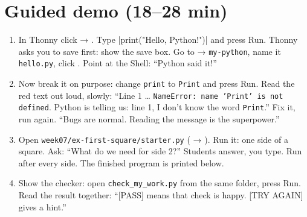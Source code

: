 \section{Guided demo (18--28 min)}
\begin{workedexample}
\begin{enumerate}[leftmargin=1.4em,itemsep=1pt]
  \item In Thonny click  → . Type \py|print("Hello, Python!")| and press Run. Thonny asks you to save first: show the save box. Go to  → \texttt{my-python}, name it \texttt{hello.py}, click . Point at the Shell: \enquote{Python said it!}
  \item Now break it on purpose: change \texttt{print} to \texttt{Print} and press Run. Read the red text out loud, slowly: \enquote{Line 1 \ldots{} \texttt{NameError: name 'Print' is not defined}. Python is telling us: line 1, I don't know the word \texttt{Print}.} Fix it, run again. \enquote{Bugs are normal. Reading the message is the superpower.}
  \item Open \texttt{week07/ex-first-square/starter.py} ( → ). Run it: one side of a square. Ask: \enquote{What do we need for side 2?} Students answer, you type. Run after every side. The finished program is printed below.
  \item Show the checker: open \texttt{check\_my\_work.py} from the same folder, press Run. Read the result together: \enquote{[PASS] means that check is happy. [TRY AGAIN] gives a hint.}
\end{enumerate}
\end{workedexample}

